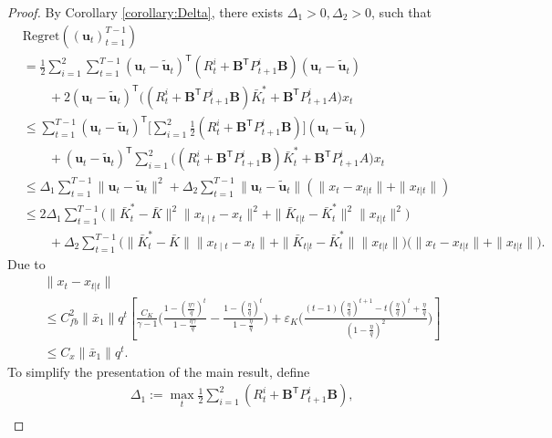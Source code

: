 \documentclass{article}
\newcommand{\contTilde}[1]{\mathbf{\tilde{#1}}}
\newcommand{\transpose}{\mathsf{T}}
\begin{document}
\begin{proof}
By Corollary \ref{corollary:Delta}, there exists $\Delta_{1}>0,\Delta_{2}>0$, such that
\begin{align*}
    &\text{Regret}((\mathbf{u}_{t})_{t=1}^{T-1})\\
    &= \frac{1}{2}\sum_{i=1}^{2}\sum_{t=1}^{T-1} (\mathbf{u}_{t}-\contTilde{u}_{t})^{\transpose}(R_{t}^{i}+\mathbf{B}^{\transpose}P_{t+1}^{i}\mathbf{B})(\mathbf{u}_{t}-\contTilde{u}_{t})\\
    &\qquad + 2(\mathbf{u}_{t}-\contTilde{u}_{t})^{\transpose}\bigg((R_{t}^{i}+\mathbf{B}^{\transpose}P_{t+1}^{i}\mathbf{B})\bar{K}_{t}^{*}+\mathbf{B}^{\transpose}P_{t+1}^{i}A\bigg)x_{t}\\
    &\leq \sum_{t=1}^{T-1} (\mathbf{u}_{t}-\contTilde{u}_{t})^{\transpose}\bigg[\sum_{i=1}^{2}\frac{1}{2}(R_{t}^{i}+\mathbf{B}^{\transpose}P_{t+1}^{i}\mathbf{B})\bigg](\mathbf{u}_{t}-\contTilde{u}_{t})\\
    &\qquad + (\mathbf{u}_{t}-\contTilde{u}_{t})^{\transpose}\sum_{i=1}^{2}\bigg( (R_{t}^{i}+\mathbf{B}^{\transpose}P_{t+1}^{i}\mathbf{B})\bar{K}_{t}^{*}+\mathbf{B}^{\transpose}P_{t+1}^{i}A\bigg)x_{t}\\
    &\leq \Delta_{1} \sum_{t=1}^{T-1} \|\mathbf{u}_{t}-\contTilde{u}_{t}\|^2 + \Delta_{2}\sum_{t=1}^{T-1} \|\mathbf{u}_{t}-\contTilde{u}_{t}\|(\|x_{t}-x_{t|t}\| + \|x_{t|t}\|)\\
    &\leq 2\Delta_{1} \sum_{t=1}^{T-1} \bigg(\|\bar{K}_{t}^{*}-\bar{K}\|^{2}\|x_{t\mid t}-x_{t}\|^{2}  + \|\bar{K}_{t|t}-\bar{K}_{t}^{*}\|^{2} \|x_{t|t}\|^{2} \bigg)\\
    &\qquad + \Delta_{2}\sum_{t=1}^{T-1}\bigg( \|\bar{K}_{t}^{*}-\bar{K}\|\|x_{t\mid t}-x_{t}\|  + \|\bar{K}_{t|t}-\bar{K}_{t}^{*}\| \|x_{t|t}\|\bigg)\bigg(\|x_{t}-x_{t|t}\| + \|x_{t|t}\|\bigg).
\end{align*}
Due to
\begin{align*}
    &\|x_{t}-x_{t|t}\|\\
    &\leq C_{fb}^{2}\|\bar{x}_{1}\|q^{t}[\frac{C_{K}}{\gamma-1}\bigg(\frac{1-(\frac{\eta\gamma}{q})^{t}}{1-\frac{\eta\gamma}{q}} - \frac{1-(\frac{\eta}{q})^{t}}{1-\frac{\eta}{q}} \bigg)+\varepsilon_{K}\bigg(\frac{(t-1)(\frac{\eta}{q})^{t+1}-t(\frac{\eta}{q})^{t}+\frac{\eta}{q}}{(1-\frac{\eta}{q})^{2}}\bigg)]\\
    &\leq C_{x}\|\bar{x}_{1}\|q^{t}.
\end{align*}
To simplify the presentation of the main result, define
\begin{align*}
    &\Delta_{1} := \max_{t} \frac{1}{2}\sum_{i=1}^{2}(R_{t}^{i}+\mathbf{B}^{\transpose}P_{t+1}^{i}\mathbf{B}),\\

\end{align*}
\end{proof}
\end{document}
